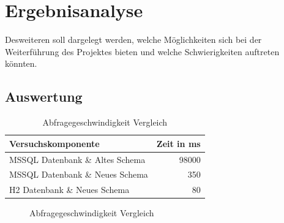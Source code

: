 
\chapter{Ergebnisanalyse}

Desweiteren soll dargelegt werden, welche Möglichkeiten sich bei der Weiterführung des Projektes bieten und welche Schwierigkeiten auftreten könnten.

\section{Auswertung}


\begin{table}[htbp]
\centering
\label{table:vergleich_abfragegeschwindigkeit}
\begin{tabular} {l | r}
Versuchskomponente & Zeit in ms  \\ \hline
MSSQL Datenbank \& Altes Schema & 98000 \\
MSSQL Datenbank \& Neues Schema & 350 \\
H2 Datenbank \& Neues Schema & 80 \\
\end{tabular}
\caption{Abfragegeschwindigkeit Vergleich}
\end{table}


\begin{figure}[htbp]
\centering
{}\hfill
{}\hfill
{}
\caption{Abfragegeschwindigkeit Vergleich}
\label{ergebniss_vergleich}
\end{figure}

